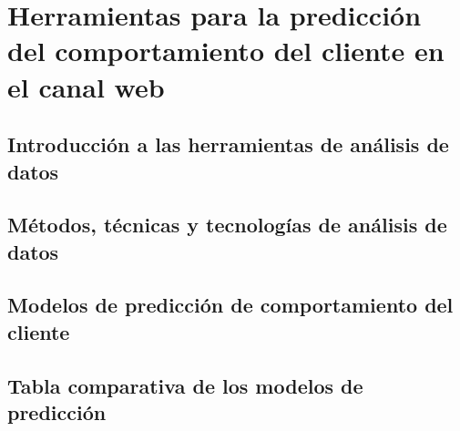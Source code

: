 \documentclass[letterpaper, 12pt]{report}
\begin{document}
\section{Herramientas para la predicción del comportamiento del cliente en el canal web}

\subsection{Introducción a las herramientas de análisis de datos}


\subsection{Métodos, técnicas y tecnologías de análisis de datos}


\subsection{Modelos de predicción de comportamiento del cliente}







\subsection{Tabla comparativa de los modelos de predicción}

\end{document}
